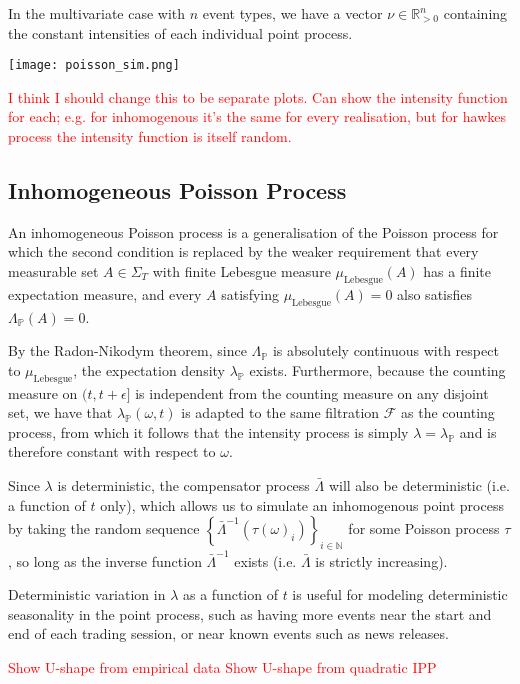 \documentclass[honours,12pt]{unswthesis}
\numberwithin{equation}{section}
\begin{document}
In the multivariate case with $n$ event types, we have a vector $\nu\in\mathbb{R}_{>0}^n$ containing the constant intensities of each individual point process.

\texttt{[image: poisson\_sim.png]}

\textcolor{red}{I think I should change this to be separate plots. Can show the intensity function for each; e.g. for inhomogenous it's the same for every realisation, but for hawkes process the intensity function is itself random.}

\subsection{Inhomogeneous Poisson Process}
An inhomogeneous Poisson process is a generalisation of the Poisson process for which the second condition is replaced by the weaker requirement that every measurable set $A\in\Sigma_T$ with finite Lebesgue measure $\mu_{\mathrm{Lebesgue}}(A)$ has a finite expectation measure, and every $A$ satisfying $\mu_\mathrm{Lebesgue}(A)=0$ also satisfies $\Lambda_\mathbb{P}(A)=0$.

By the Radon-Nikodym theorem, since $\Lambda_\mathbb{P}$ is absolutely continuous with respect to $\mu_\mathrm{Lebesgue}$, the expectation density $\lambda_\mathbb{P}$ exists. Furthermore, because the counting measure on $(t,t+\epsilon]$ is independent from the counting measure on any disjoint set, we have that $\lambda_\mathbb{P}(\omega,t)$ is adapted to the same filtration $\mathcal{F}$ as the counting process, from which it follows that the intensity process is simply $\lambda=\lambda_\mathbb{P}$ and is therefore constant with respect to $\omega$.

Since $\lambda$ is deterministic, the compensator process $\bar\Lambda$ will also be deterministic (i.e. a function of $t$ only), which allows us to simulate an inhomogenous point process by taking the random sequence $\left\{{\bar\Lambda}^{-1}(\tau(\omega)_i)\right\}_{i\in\mathbb{N}}$ for some Poisson process $\tau$, so long as the inverse function ${\bar\Lambda}^{-1}$ exists (i.e. $\bar\Lambda$ is strictly increasing).

Deterministic variation in $\lambda$ as a function of $t$ is useful for modeling deterministic seasonality in the point process, such as having more events near the start and end of each trading session, or near known events such as news releases.

\textcolor{red}{Show U-shape from empirical data}
\textcolor{red}{Show U-shape from quadratic IPP}
\end{document}
